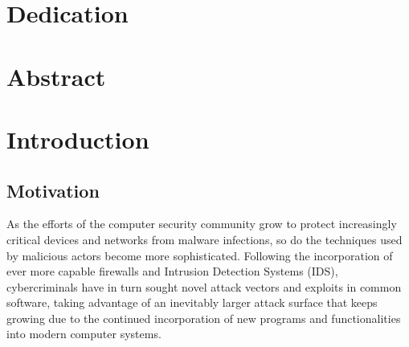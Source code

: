 \documentclass[12pt]{report} %
\begin{document}
\chapter*{Dedication}

\setcounter{page}{5}
	
		
	\vfill
	
	\newpage
	\thispagestyle{empty}
	\mbox{}
	
\chapter*{Abstract}

\setcounter{page}{5}
	
		
	\vfill
	
	\newpage
	\thispagestyle{empty}
	\mbox{}
	


\tableofcontents
\thispagestyle{fancy}

\newpage
\thispagestyle{empty}
\mbox{}

\listoffigures
\thispagestyle{fancy}

\newpage
\thispagestyle{empty}
\mbox{}

\listoftables
\thispagestyle{fancy}

\newpage %
\thispagestyle{empty}
\mbox{}


\clearpage
{}

\chapter{Introduction}
\section{Motivation}

As the efforts of the computer security community grow to protect increasingly critical devices and networks from malware infections, so do the techniques used by malicious actors become more sophisticated. Following the incorporation of ever more capable firewalls and Intrusion Detection Systems (IDS), cybercriminals have in turn sought novel attack vectors and exploits in common software, taking advantage of an inevitably larger attack surface that keeps growing due to the continued incorporation of new programs and functionalities into modern computer systems.
\end{document}
